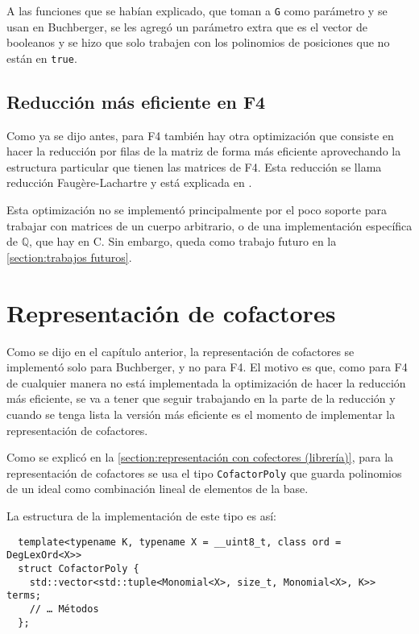 \documentclass[12pt]{report}
\theoremstyle{customstyle}
\theoremstyle{factstyle}
\newcommand\cpp{C\nolinebreak[4]\hspace{-.05em}\raisebox{.4ex}{\relsize{-3}{\textbf{++}}}\xspace}
\begin{document}
A las funciones que se habían explicado, que toman a \texttt{G} como parámetro y se usan en Buchberger, se les agregó un parámetro extra que es el vector de booleanos y se hizo que solo trabajen con los polinomios de posiciones que no están en \texttt{true}.

\subsection{Reducción más eficiente en F4}\label{subsection:Reducción más eficiente en F4}

Como ya se dijo antes, para F4 también hay otra optimización que consiste en hacer la reducción por filas de la matriz de forma más eficiente aprovechando la estructura particular que tienen las matrices de F4. Esta reducción se llama reducción Faugère-Lachartre y está explicada en \cite{thesis:Hof20}.

Esta optimización no se implementó principalmente por el poco soporte para trabajar con matrices de un cuerpo arbitrario, o de una implementación específica de $ℚ$, que hay en \cpp. Sin embargo, queda como trabajo futuro en la \cref{section:trabajos futuros}.

\section{Representación de cofactores}

Como se dijo en el capítulo anterior, la representación de cofactores se implementó solo para Buchberger, y no para F4. El motivo es que, como para F4 de cualquier manera no está implementada la optimización de hacer la reducción más eficiente, se va a tener que seguir trabajando en la parte de la reducción y cuando se tenga lista la versión más eficiente es el momento de implementar la representación de cofactores.

Como se explicó en la \cref{section:representación con cofectores (librería)}, para la representación de cofactores se usa el tipo \texttt{CofactorPoly} que guarda polinomios de un ideal como combinación lineal de elementos de la base.

La estructura de la implementación de este tipo es así:

\begin{verbatim}
  template<typename K, typename X = __uint8_t, class ord = DegLexOrd<X>>
  struct CofactorPoly {
    std::vector<std::tuple<Monomial<X>, size_t, Monomial<X>, K>> terms;
    // … Métodos
  };
\end{verbatim}
\end{document}
